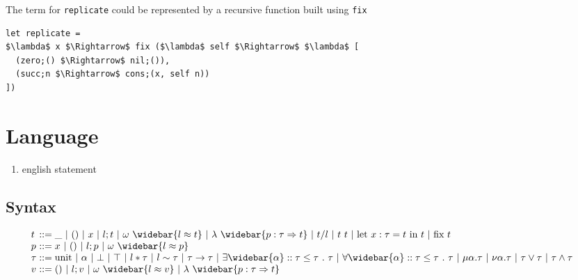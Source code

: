 \documentclass[manuscript]{acmart}
\begin{document}
\noindent The term for \lstinline{replicate} could be represented by a recursive function built using \lstinline{fix} 

\begin{lstlisting}[]
let replicate = 
$\lambda$ x $\Rightarrow$ fix ($\lambda$ self $\Rightarrow$ $\lambda$ [
  (zero;() $\Rightarrow$ nil;()),
  (succ;n $\Rightarrow$ cons;(x, self n))
]) 
\end{lstlisting}


\section{Language}
\begin{enumerate}
  \item english statement 
\end{enumerate}
\subsection{Syntax}

\[
  \begin{array}{l @{} l}
    t 
    &{} ::=
    \begin{array}[t]{@{} l}
      \_ 
      \ |\ 
      () 
      \ |\ 
      x
      \ |\ 
      l;t 
      \ |\ 
      \omega\ \widebar{l \approx t}
      \ |\ 
      \lambda\ \widebar{p : \tau \Rightarrow t} 
      \ |\ 
      t/l
      \ |\ 
      t\ t
      \ |\ 
      \text{let } x : \tau = t\ \text{in } t
      \ |\ 
      \text{fix } t
    \end{array}
    \\
    p 
    &{} ::=
    \begin{array}[t]{@{} l}
      x 
      \ |\ 
      () 
      \ |\ 
      l;p
      \ |\ 
      \omega\ \widebar{l \approx p}
    \end{array}
    \\
    \tau
    &{} ::=
    \begin{array}[t]{@{} l}
      \text{unit} 
      \ |\ 
      \alpha 
      \ |\ 
      \bot 
      \ |\ 
      \top 
      \ |\ 
      l*\tau 
      \ |\ 
      l\sim\tau 
      \ |\ 
      \tau\rightarrow\tau 
      \ |\ 
      \exists \widebar{\alpha} :: \tau \leq \tau \ .\ \tau 
      \ |\ 
      \forall \widebar{\alpha} :: \tau \leq \tau \ .\ \tau 
      \ |\ 
      \mu \alpha.\tau 
      \ |\ 
      \nu \alpha.\tau 
      \ |\ 
      \tau \vee \tau
      \ |\ 
      \tau \wedge \tau
    \end{array}
    \\
    v 
    &{} ::=
    \begin{array}[t]{@{} l}
      () 
      \ |\ 
      l;v
      \ |\ 
      \omega\ \widebar{l \approx v}
      \ |\ 
      \lambda\ \widebar{p : \tau \Rightarrow t} 
    \end{array}
  \end{array}
\]
\end{document}
